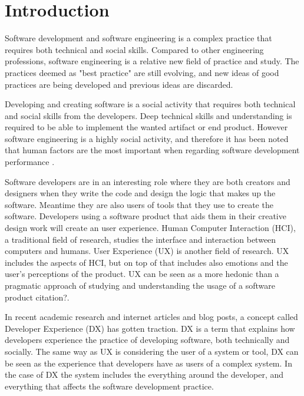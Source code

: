 \documentclass[english, 12pt, a4paper, sci, utf8, a-1b, online]{aaltothesis}
\begin{document}
\cleardoublepage
\section{Introduction} \label{introduction}

Software development and software engineering is a complex practice that requires both technical and social skills. Compared to other engineering professions, software engineering is a relative new field of practice and study. The practices deemed as "best practice" are still evolving, and new ideas of good practices are being developed and previous ideas are discarded.

Developing and creating software is a social activity that requires both technical and social skills from the developers. Deep technical skills and understanding is required to be able to implement the wanted artifact or end product. However software engineering is a highly social activity, and therefore it has been noted that human factors are the most important when regarding software development performance \citep{peopleware}.

Software developers are in an interesting role where they are both creators and designers when they write the code and design the logic that makes up the software. Meantime they are also users of tools that they use to create the software. Developers using a software product that aids them in their creative design work will create an user experience. Human Computer Interaction (HCI), a traditional field of research, studies the interface and interaction between computers and humans. User Experience (UX) is another field of research. UX includes the aspects of HCI, but on top of that includes also emotions and the user's perceptions of the product. UX can be seen as a more hedonic than a pragmatic approach of studying and understanding the usage of a software product {\color{red} citation?}.

In recent academic research and internet articles and blog posts, a concept called Developer Experience (DX) has gotten traction. DX is a term that explains how developers experience the practice of developing software, both technically and socially. The same way as UX is considering the user of a system or tool, DX can be seen as the experience that developers have as users of a complex system. In the case of DX the system includes the everything around the developer, and everything that affects the software development practice.
\end{document}
